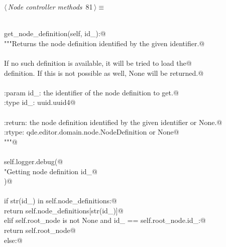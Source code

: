 \documentclass[
    a4paper,      %
    10pt,         %
    openright,    %
    notitlepage,  %
    parskip=half, %
]{scrreprt}       %
\theoremstyle{definition}                    %
\begin{document}
\begin{flushleft} \small
\begin{minipage}{\linewidth}\label{scrap131}\raggedright\small
{} $\langle\,${\itshape Node controller methods}\nobreak\ {\footnotesize {81}}$\,\rangle\equiv$
\vspace{-1exm}
\begin{list}{}{} \item
\mbox{}\lstinline@@\\
\mbox{}\lstinline@def get_node_definition(self, id_):@\\
\mbox{}\lstinline@    """Returns the node definition identified by the given identifier.@\\
\mbox{}\lstinline@@\\
\mbox{}\lstinline@    If no such definition is available, it will be tried to load the@\\
\mbox{}\lstinline@    definition. If this is not possible as well, None will be returned.@\\
\mbox{}\lstinline@@\\
\mbox{}\lstinline@    :param id_: the identifier of the node definition to get.@\\
\mbox{}\lstinline@    :type  id_: uuid.uuid4@\\
\mbox{}\lstinline@@\\
\mbox{}\lstinline@    :return: the node definition identified by the given identifier or None.@\\
\mbox{}\lstinline@    :rtype:  qde.editor.domain.node.NodeDefinition or None@\\
\mbox{}\lstinline@    """@\\
\mbox{}\lstinline@@\\
\mbox{}\lstinline@    self.logger.debug(@\\
\mbox{}\lstinline@        "Getting node definition %s",@\\
\mbox{}\lstinline@        id_@\\
\mbox{}\lstinline@    )@\\
\mbox{}\lstinline@@\\
\mbox{}\lstinline@    if str(id_) in self.node_definitions:@\\
\mbox{}\lstinline@        return self.node_definitions[str(id_)]@\\
\mbox{}\lstinline@    elif self.root_node is not None and id_ == self.root_node.id_:@\\
\mbox{}\lstinline@        return self.root_node@\\
\mbox{}\lstinline@    else:@\\

\end{list}
\end{minipage}
\end{flushleft}
\end{document}
